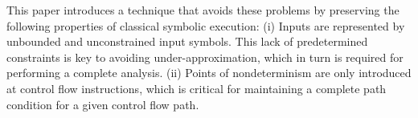 


This paper introduces a technique that avoids these problems by preserving the following properties of classical symbolic execution: (i) Inputs are represented by unbounded and unconstrained input symbols. This lack of predetermined constraints is key to avoiding under-approximation, which in turn is required for performing a complete analysis. (ii) Points of nondeterminism are only introduced at control flow instructions, which is critical for maintaining a complete path condition for a given control flow path. 







